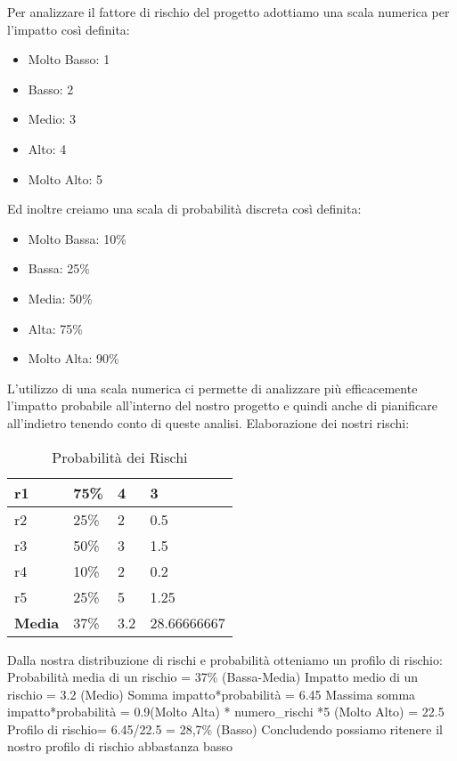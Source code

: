 	Per analizzare il fattore di rischio del progetto adottiamo una scala numerica per l’impatto così definita:
	\begin{itemize}
		\item Molto Basso: 1
		\item Basso: 2
		\item Medio: 3
		\item Alto: 4
		\item Molto Alto: 5
	\end{itemize}
	Ed inoltre creiamo una scala di probabilità discreta così definita:
	\begin{itemize}
		\item Molto Bassa: 10\%
		\item Bassa: 25\%
		\item Media: 50\%
		\item Alta: 75\%
		\item Molto Alta: 90\%
	\end{itemize}
	L’utilizzo di una scala numerica ci permette di analizzare più efficacemente l’impatto probabile all’interno del nostro progetto e quindi anche di pianificare all’indietro tenendo conto di queste analisi.
	Elaborazione dei nostri rischi:
	\begin{table}[h!]
		\centering
		\renewcommand{\arraystretch}{2} 
		\begin{tabular}{|l|l|l|l|}
			\rowcolor{orange!50}
			\hline
			r1 & 75\% & 4 & 3 \\
			\hline
			r2 &  25\%  & 2  & 0.5 \\
			\hline
			r3  & 50\%  & 3  & 1.5 \\
			\hline
			r4  & 10\% &  2 &  0.2 \\
			\hline
			r5  & 25\%  & 5  & 1.25 \\
			\hline
			\textbf{Media}  & 37\% &  3.2 &  28.66666667\\
			\hline
		\end{tabular}
		\caption{Probabilità dei Rischi}
	\end{table}
	\newline 
	Dalla nostra distribuzione di rischi e probabilità otteniamo un profilo di rischio:
	Probabilità media di un rischio = 37\% (Bassa-Media)
	Impatto medio di un rischio = 3.2 (Medio)
	Somma impatto*probabilità = 6.45
	Massima somma impatto*probabilità = 0.9(Molto Alta) * numero\_rischi *5 (Molto Alto) = 22.5
	Profilo di rischio= 6.45/22.5 = 28,7\% (Basso)
	Concludendo possiamo ritenere il nostro profilo di rischio abbastanza basso